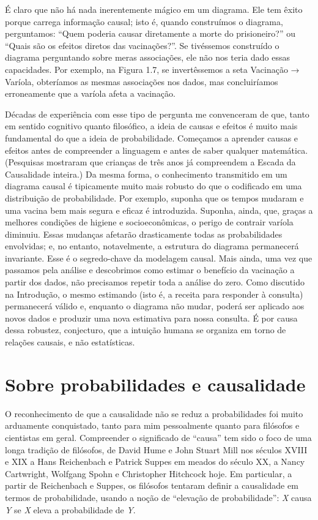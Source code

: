 \documentclass[11pt,a5paper,twoside]{book}
\begin{document}
É claro que não há nada inerentemente mágico em um diagrama. Ele tem êxito porque carrega informação causal; isto é, quando construímos o diagrama, perguntamos: “Quem poderia causar diretamente a morte do prisioneiro?” ou “Quais são os efeitos diretos das vacinações?”. Se tivéssemos construído o diagrama perguntando sobre meras associações, ele não nos teria dado essas capacidades. Por exemplo, na Figura 1.7, se invertêssemos a seta Vacinação → Varíola, obteríamos as mesmas associações nos dados, mas concluiríamos erroneamente que a varíola afeta a vacinação.

Décadas de experiência com esse tipo de pergunta me convenceram de que, tanto em sentido cognitivo quanto filosófico, a ideia de causas e efeitos é muito mais fundamental do que a ideia de probabilidade. Começamos a aprender causas e efeitos antes de compreender a linguagem e antes de saber qualquer matemática. (Pesquisas mostraram que crianças de três anos já compreendem a Escada da Causalidade inteira.) Da mesma forma, o conhecimento transmitido em um diagrama causal é tipicamente muito mais robusto do que o codificado em uma distribuição de probabilidade. Por exemplo, suponha que os tempos mudaram e uma vacina bem mais segura e eficaz é introduzida. Suponha, ainda, que, graças a melhores condições de higiene e socioeconômicas, o perigo de contrair varíola diminuiu. Essas mudanças afetarão drasticamente todas as probabilidades envolvidas; e, no entanto, notavelmente, a estrutura do diagrama permanecerá invariante. Esse é o segredo-chave da modelagem causal. Mais ainda, uma vez que passamos pela análise e descobrimos como estimar o benefício da vacinação a partir dos dados, não precisamos repetir toda a análise do zero. Como discutido na Introdução, o mesmo estimando (isto é, a receita para responder à consulta) permanecerá válido e, enquanto o diagrama não mudar, poderá ser aplicado aos novos dados e produzir uma nova estimativa para nossa consulta. É por causa dessa robustez, conjecturo, que a intuição humana se organiza em torno de relações causais, e não estatísticas.

\section{Sobre probabilidades e causalidade}
O reconhecimento de que a causalidade não se reduz a probabilidades foi muito arduamente conquistado, tanto para mim pessoalmente quanto para filósofos e cientistas em geral. Compreender o significado de “causa” tem sido o foco de uma longa tradição de filósofos, de David Hume e John Stuart Mill nos séculos XVIII e XIX a Hans Reichenbach e Patrick Suppes em meados do século XX, a Nancy Cartwright, Wolfgang Spohn e Christopher Hitchcock hoje. Em particular, a partir de Reichenbach e Suppes, os filósofos tentaram definir a causalidade em termos de probabilidade, usando a noção de “elevação de probabilidade”: \textit{X} causa \textit{Y} se \textit{X} eleva a probabilidade de \textit{Y}.
\end{document}
